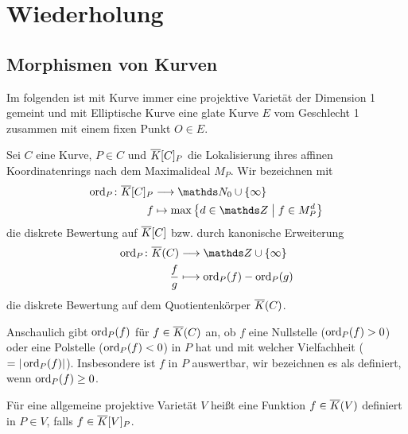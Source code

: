 \section{Wiederholung}
\subsection{Morphismen von Kurven}
Im folgenden ist mit Kurve immer eine projektive Varietät der
Dimension 1 gemeint und mit Elliptische Kurve eine glate Kurve $E$ vom
Geschlecht 1 zusammen mit einem fixen Punkt $O\in E$.

\begin{Definition}[Definiertheit]
  Sei $C$ eine Kurve, $P\in C$ und $\overline K[C]_P$ die Lokalisierung
  ihres affinen Koordinatenrings nach dem Maximalideal $M_P$.
  Wir bezeichnen mit
  \begin{align*}
    \ord_P\colon \algK[C]_P &\longto \N_0 \cup \{\infty\} \\
    f &\mapsto \max\left\{d\in\Z\;\middle|\; f\in M_P^d \right\}
  \end{align*}
  die diskrete Bewertung auf $\overline K[C]$ bzw. durch kanonische
  Erweiterung
  \begin{align*}
    \ord_P\colon \algK(C) &\longto \Z \cup \{\infty\} \\
    \frac{f}{g} &\longmapsto \ord_P(f) - \ord_P(g)
  \end{align*}
  die diskrete Bewertung auf dem Quotientenkörper $\overline K(C)$.

  Anschaulich gibt $\operatorname{ord}_P(f)$ für $f\in\overline K(C)$ an, ob $f$
  eine Nullstelle ($\operatorname{ord}_P(f)>0$) oder eine Polstelle ($\operatorname{ord}_P(f)<0$)
  in $P$ hat und mit welcher Vielfachheit ($=|\operatorname{ord}_P(f)|$).
  Insbesondere ist $f$ in $P$ auswertbar, wir bezeichnen es als
  definiert, wenn $\operatorname{ord}_P(f)\geq 0$.

  Für eine allgemeine projektive Varietät $V$ heißt eine Funktion
  $f\in\overline K(V)$ definiert in $P\in V$, falls $f\in\overline K[V]_P$.
\end{Definition}

